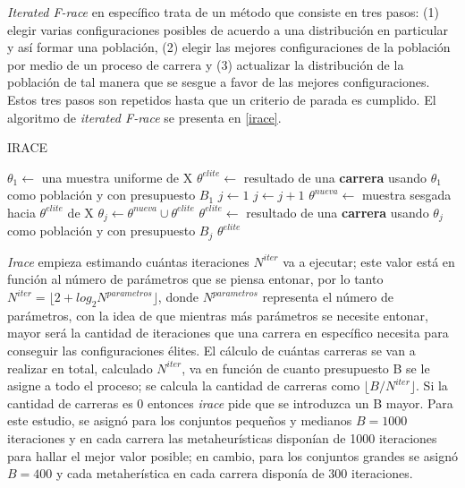 \emph{Iterated F-race} en específico trata de un método que consiste en tres pasos: (1) elegir varias configuraciones posibles de acuerdo a una distribución en particular y así formar una población, (2) elegir las mejores configuraciones de la población por medio de un proceso de carrera y (3) actualizar la distribución de la población de tal manera que se sesgue a favor de las mejores configuraciones. Estos tres pasos son repetidos hasta que un criterio de parada es cumplido. El algoritmo de \emph{iterated F-race} se presenta en \ref{irace}.

\begin{algorithm}
\caption{IRACE}
\label{irace}
\begin{algorithmic}[1]


\State $\theta_1 \gets$ una muestra uniforme de X
\State $\theta^{elite} \gets$ resultado de una \textbf{carrera} usando $\theta_1$ como población y con presupuesto $B_1$
\State $j \gets 1$
	\State $j \gets j + 1$
	\State $\theta^{nueva} \gets$ muestra sesgada hacia $\theta^{elite}$ de X 
	\State $\theta_j \gets \theta^{nueva} \cup \theta^{elite}$
	\State $\theta^{elite} \gets$ resultado de una \textbf{carrera} usando $\theta_j$ como población y con presupuesto $B_j$
\EndWhile
\State \Return $\theta^{elite}$

\end{algorithmic}
\end{algorithm}

\emph{Irace} empieza estimando cuántas iteraciones $N^{iter}$ va a ejecutar; este valor está en función al número de parámetros que se piensa entonar, por lo tanto $N^{iter} = \lfloor 2 + log_2 N^{parametros} \rfloor$, donde $N^{parametros}$ representa el número de parámetros, con la idea de que mientras más parámetros se necesite entonar, mayor será la cantidad de iteraciones que una carrera en específico necesita para conseguir las configuraciones élites. El cálculo de cuántas carreras se van a realizar en total, calculado $N^{iter}$, va en función de cuanto presupuesto B se le asigne a todo el proceso; se calcula la cantidad de carreras como $\lfloor B / N^{iter} \rfloor$. Si la cantidad de carreras es 0 entonces \emph{irace} pide que se introduzca un B mayor. Para este estudio, se asignó para los conjuntos pequeños y medianos $ B = 1000$ iteraciones y en cada carrera las metaheurísticas disponían de 1000 iteraciones para hallar el mejor valor posible; en cambio, para los conjuntos grandes se asignó $B = 400$ y cada metaherística en cada carrera disponía de 300 iteraciones.

